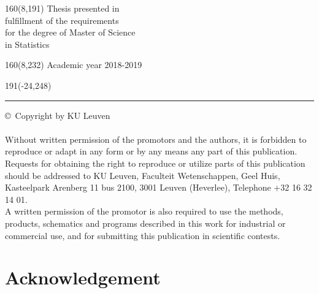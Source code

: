 \documentclass[12pt,a4paper,oneside]{book}
\newenvironment{bottompar}{\par\vspace*{\fill}}{\clearpage}
\begin{document}
%
\begin{textblock}{160}(8,191)
\textblockcolour{}
\vspace{-\parskip}
\flushright
Thesis presented in\\[4.5pt]
fulfillment of the requirements\\[4.5pt]
for the degree of Master of Science\\[4.5pt]
in Statistics\\
\end{textblock}
%
\begin{textblock}{160}(8,232)
\textblockcolour{}
\vspace{-\parskip}
\flushright
Academic year 2018-2019
\end{textblock}
%
\begin{textblock}{191}(-24,248)
{\color{blueline}\rule{550pt}{5.5pt}}
\end{textblock}
%
\vfill
\newpage


\rmfamily
\pagestyle{plain}


\newpage
{}

\begin{bottompar}
\copyright \ Copyright by KU Leuven \\ \\
Without written permission of the promotors and the authors, it is forbidden to reproduce or adapt in any form or by any means any part of this publication. Requests for obtaining the right to reproduce or utilize parts of this publication should be addressed to KU Leuven, Faculteit Wetenschappen, Geel Huis, Kasteelpark Arenberg 11 bus 2100, 3001 Leuven (Heverlee), Telephone +32 16 32 14 01. \\
A written permission of the promotor is also required to use the methods, products, schematics and programs described in this work for industrial or commercial use, and for submitting this publication in scientific contests.
\end{bottompar}

\newpage
\setcounter{page}{0}

\chapter*{Acknowledgement}
\end{document}
